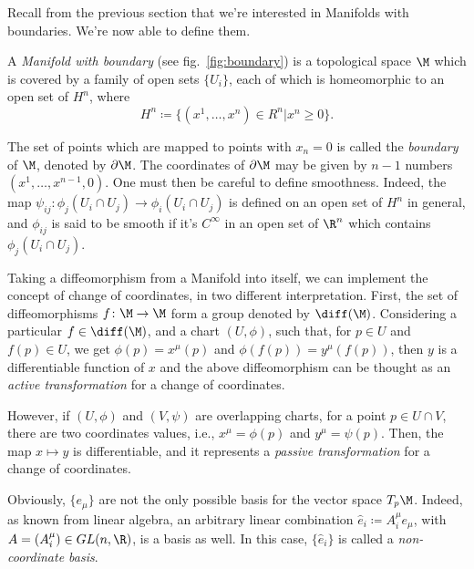 Recall from the previous section that we're interested in Manifolds with boundaries. We're now able to define them.
\begin{definition}
    A \emph{Manifold with boundary} (see fig.~\ref{fig:boundary}) is a topological space $\M$ which is covered by a family of open sets $\{U_i\}$, each of which is homeomorphic to an open set of $H^n$, where
    \begin{equation}
        H^n \coloneq \{ (x^1, \dots, x^n) \in R^n | x^n \geq 0 \} .
    \end{equation} 
\end{definition}

The set of points which are mapped to points with $x_n = 0$ is called the \emph{boundary} of $\M$, denoted by $\partial \M$. The coordinates of $\partial \M$ may be given by $n-1$ numbers $(x^1, \dots, x^{n-1},0)$. One must then be careful to define smoothness. Indeed, the map $\psi_{ij} \colon \phi_j (U_i \cap U_j) \to \phi_i(U_i \cap U_j)$ is defined on an open set of $H^n$ in general, and $\phi_{ij}$ is said to be smooth if it's $C^\infty$ in an open set of $\R^n$ which contains $\phi_j(U_i \cap U_j)$.

Taking a diffeomorphism from a Manifold into itself, we can implement the concept of change of coordinates, in two different interpretation. First, the set of diffeomorphisms $f\colon \M \to \M$ form a group denoted by $\diff(\M)$. Considering a particular $f \in \diff(\M)$, and a chart $(U, \phi)$, such that, for $p \in U$ and $f(p) \in U$, we get $\phi(p) = x^\mu(p)$ and $\phi(f(p))=y^\mu(f(p))$, then $y$ is a differentiable function of $x$ and the above diffeomorphism can be thought as an \emph{active transformation} for a change of coordinates.

However, if $(U,\phi)$ and $(V,\psi)$ are overlapping charts, for a point $p \in U \cap V$, there are two coordinates values, i.e., $x^\mu = \phi(p)$ and $y^\mu = \psi(p)$. Then, the map $x \mapsto y$ is differentiable, and it represents a \emph{passive transformation} for a change of coordinates.




Obviously, $\{e_\mu\}$ are not the only possible basis for the vector space $T_p \M$. Indeed, as known from linear algebra, an arbitrary linear combination $\hat{e}_i \coloneq A_i^\mu e_\mu$, with $A = (A_i^\mu) \in GL(n,\R)$, is a basis as well. In this case, $\{\hat{e}_i\}$ is called a \emph{non-coordinate basis}.

